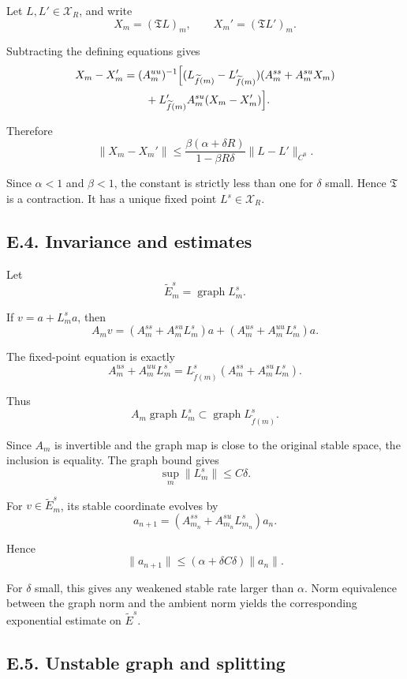 \documentclass[12pt,a4paper]{article}
\theoremstyle{plain}
\numberwithin{equation}{section}
\numberwithin{theorem}{section}
\begin{document}
Let $L,L'\in\mathcal X_R$, and write
\[
X_m=(\mathfrak T L)_m,
\qquad
X_m'=(\mathfrak T L')_m.
\]

Subtracting the defining equations gives
\[
\begin{aligned}
X_m-X_m'
&=(A_m^{uu})^{-1}
\Bigl[
(L_{\widetilde f(m)}-L'_{\widetilde f(m)})(A_m^{ss}+A_m^{su}X_m)\\
&\qquad
+L'_{\widetilde f(m)}A_m^{su}(X_m-X_m')
\Bigr].
\end{aligned}
\]

Therefore
\[
\|X_m-X_m'\|
\le
\frac{\beta(\alpha+\delta R)}{1-\beta R\delta}
\|L-L'\|_{C^0}.
\]

Since $\alpha<1$ and $\beta<1$, the constant is strictly less than one for $\delta$ small. Hence $\mathfrak T$ is a contraction. It has a unique fixed point $L^s\in\mathcal X_R$.

\subsection{E.4. Invariance and estimates}

Let
\[
\widetilde E_m^s=
\operatorname{graph}L_m^s.
\]

If $v=a+L_m^s a$, then
\[
A_m v
=
(A_m^{ss}+A_m^{su}L_m^s)a
+
(A_m^{us}+A_m^{uu}L_m^s)a.
\]

The fixed-point equation is exactly
\[
A_m^{us}+A_m^{uu}L_m^s
=
L_{\widetilde f(m)}^s(A_m^{ss}+A_m^{su}L_m^s).
\]

Thus
\[
A_m\operatorname{graph}L_m^s
\subset
\operatorname{graph}L_{\widetilde f(m)}^s.
\]

Since $A_m$ is invertible and the graph map is close to the original stable space, the inclusion is equality. The graph bound gives
\[
\sup_m\|L_m^s\|\le C\delta.
\]

For $v\in\widetilde E_m^s$, its stable coordinate evolves by
\[
a_{n+1}=(A_{m_n}^{ss}+A_{m_n}^{su}L_{m_n}^s)a_n.
\]

Hence
\[
\|a_{n+1}\|
\le
(\alpha+
\delta C\delta)
\|a_n\|.
\]

For $\delta$ small, this gives any weakened stable rate larger than $\alpha$. Norm equivalence between the graph norm and the ambient norm yields the corresponding exponential estimate on $\widetilde E^s$.

\subsection{E.5. Unstable graph and splitting}
\end{document}

